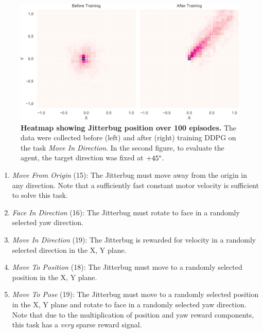 \documentclass{article}
\begin{document}
\begin{figure}[t]
    \centering
    \includegraphics[width=\linewidth]{fig-heatmap}
    \caption{
        \textbf{Heatmap showing Jitterbug position over 100 episodes.}
        The data were collected before (left) and after (right) training DDPG on the task \emph{Move In Direction}.
        In the second figure, to evaluate the agent, the target direction was fixed at $+45\degree$.
    }
    \label{fig:heatmap}
\end{figure}

\begin{enumerate}[topsep=8pt, partopsep=0pt]
    
    \item \emph{Move From Origin} (15): The Jitterbug must move away from the origin in any direction.
    Note that a sufficiently fast constant motor velocity is sufficient to solve this task.
    
    \item \emph{Face In Direction} (16): The Jitterbug must rotate to face in a randomly selected yaw direction.
    
    \item \emph{Move In Direction} (19): The Jitterbug is rewarded for velocity in a randomly selected direction in the X, Y plane.
    
    \item \emph{Move To Position} (18): The Jitterbug must move to a randomly selected position in the X, Y plane.
    
    \item \emph{Move To Pose} (19): The Jitterbug must move to a randomly selected position in the X, Y plane and rotate to face in a randomly selected yaw direction.
    Note that due to the multiplication of position and yaw reward components, this task has a \emph{very} sparse reward signal.
    
\end{enumerate}
\end{document}
